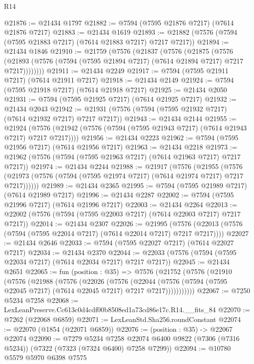 \begin{lexlean}{R14}
\begin{coremodule}
@21876 := @21434 @1797
@21882 := @7594 (@7595 @21876 @7217) (@7614 @21876 @7217)
@21883 := @21434 @1619
@21893 := @21882 (@7576 (@7594 (@7595 @21883 @7217) (@7614 @21883 @7217) @7217 @7217))
@21894 := @21434 @1846
@21910 := @21759
    (@7576
      (@21837
        (@7576
          (@21875
            (@7576
              (@21893 (@7576 (@7594 (@7595 @21894 @7217) (@7614 @21894 @7217) @7217 @7217))))))))
@21911 := @21434 @2249
@21917 := @7594 (@7595 @21911 @7217) (@7614 @21911 @7217)
@21918 := @21434 @2149
@21924 := @7594 (@7595 @21918 @7217) (@7614 @21918 @7217)
@21925 := @21434 @2050
@21931 := @7594 (@7595 @21925 @7217) (@7614 @21925 @7217)
@21932 := @21434 @2043
@21942 := @21931 (@7576 (@7594 (@7595 @21932 @7217) (@7614 @21932 @7217) @7217 @7217))
@21943 := @21434 @2144
@21955 := @21924
    (@7576 (@21942 (@7576 (@7594 (@7595 @21943 @7217) (@7614 @21943 @7217) @7217 @7217))))
@21956 := @21434 @2223
@21962 := @7594 (@7595 @21956 @7217) (@7614 @21956 @7217)
@21963 := @21434 @2218
@21973 := @21962 (@7576 (@7594 (@7595 @21963 @7217) (@7614 @21963 @7217) @7217 @7217))
@21974 := @21434 @2244
@21988 := @21917
    (@7576
      (@21955
        (@7576 (@21973 (@7576 (@7594 (@7595 @21974 @7217) (@7614 @21974 @7217) @7217 @7217))))))
@21989 := @21434 @2365
@21995 := @7594 (@7595 @21989 @7217) (@7614 @21989 @7217)
@21996 := @21434 @2287
@22002 := @7594 (@7595 @21996 @7217) (@7614 @21996 @7217)
@22003 := @21434 @2264
@22013 := @22002 (@7576 (@7594 (@7595 @22003 @7217) (@7614 @22003 @7217) @7217 @7217))
@22014 := @21434 @2307
@22026 := @21995
    (@7576 (@22013 (@7576 (@7594 (@7595 @22014 @7217) (@7614 @22014 @7217) @7217 @7217))))
@22027 := @21434 @2646
@22033 := @7594 (@7595 @22027 @7217) (@7614 @22027 @7217)
@22034 := @21434 @2370
@22044 := @22033 (@7576 (@7594 (@7595 @22034 @7217) (@7614 @22034 @7217) @7217 @7217))
@22045 := @21434 @2651
@22065 := fun (position : @35) =>
  @7576
    (@21752
      (@7576
        (@21910
          (@7576
            (@21988
              (@7576
                (@22026
                  (@7576
                    (@22044
                      (@7576 (@7594 (@7595 @22045 @7217) (@7614 @22045 @7217) @7217 @7217)))))))))))
@22067 := @7250 @5234 @7258
@22068 := LexLeanPreserve.Cc613c0d4cdf00b8508ed1a73cd86e17c.R14.__fits_84
@22070 := @7262 (@22068 @6859)
@22071 := LexLeanStd.Sha256.roundConstant
@22074 := @22070 (@1854 (@22071 @6859))
@22076 := (position : @35) -> @22067 @22074
@22090 := @7279
    @5234
    @7258
    @22074
    @6400
    @9822
    (@7306 (@7316 @5234))
    (@7322 (@7323 (@7324 @6400) @7258 @7299))
@22094 := @10780 @5579 @5970 @6398 @7575

\end{coremodule}
\end{lexlean}
